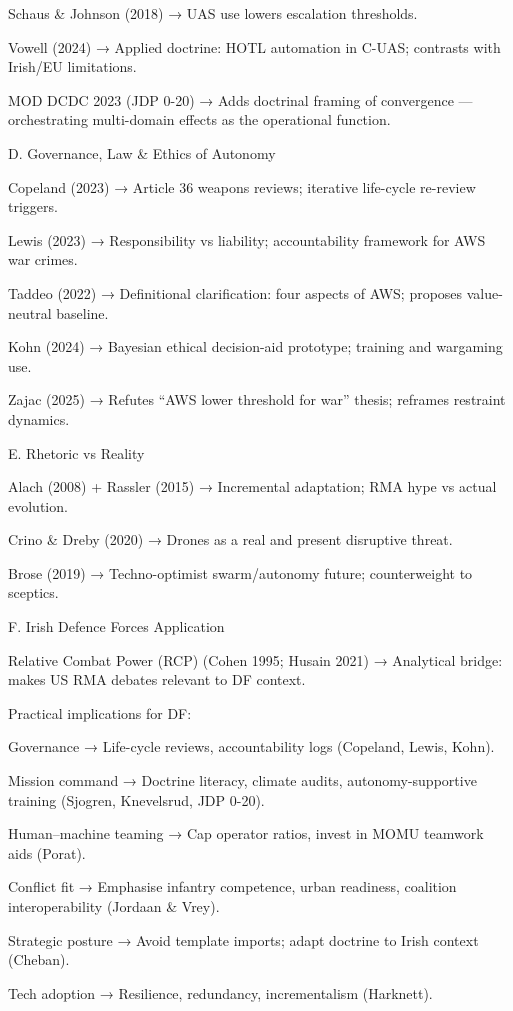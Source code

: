 Schaus \& Johnson (2018) → UAS use lowers escalation thresholds.

Vowell (2024) → Applied doctrine: HOTL automation in C-UAS; contrasts with Irish/EU limitations.

MOD DCDC 2023 (JDP 0-20) → Adds doctrinal framing of convergence — orchestrating multi-domain effects as the operational function.

D. Governance, Law \& Ethics of Autonomy

Copeland (2023) → Article 36 weapons reviews; iterative life-cycle re-review triggers.

Lewis (2023) → Responsibility vs liability; accountability framework for AWS war crimes.

Taddeo (2022) → Definitional clarification: four aspects of AWS; proposes value-neutral baseline.

Kohn (2024) → Bayesian ethical decision-aid prototype; training and wargaming use.

Zajac (2025) → Refutes “AWS lower threshold for war” thesis; reframes restraint dynamics.

E. Rhetoric vs Reality

Alach (2008) + Rassler (2015) → Incremental adaptation; RMA hype vs actual evolution.

Crino \& Dreby (2020) → Drones as a real and present disruptive threat.

Brose (2019) → Techno-optimist swarm/autonomy future; counterweight to sceptics.

F. Irish Defence Forces Application

Relative Combat Power (RCP) (Cohen 1995; Husain 2021) → Analytical bridge: makes US RMA debates relevant to DF context.

Practical implications for DF:

Governance → Life-cycle reviews, accountability logs (Copeland, Lewis, Kohn).

Mission command → Doctrine literacy, climate audits, autonomy-supportive training (Sjogren, Knevelsrud, JDP 0-20).

Human–machine teaming → Cap operator ratios, invest in MOMU teamwork aids (Porat).

Conflict fit → Emphasise infantry competence, urban readiness, coalition interoperability (Jordaan \& Vrey).

Strategic posture → Avoid template imports; adapt doctrine to Irish context (Cheban).

Tech adoption → Resilience, redundancy, incrementalism (Harknett).

